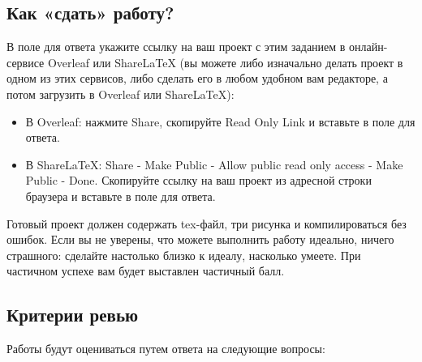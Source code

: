 \documentclass[a4paper,12pt]{article}
\begin{document}
\subsection*{Как «сдать» работу?}

В поле для ответа укажите ссылку на ваш проект с этим заданием в онлайн-сервисе Overleaf или ShareLaTeX (вы можете либо изначально делать проект в одном из этих сервисов, либо сделать его в любом удобном вам редакторе, а потом загрузить в Overleaf или ShareLaTeX):

\begin{itemize}
    \item В Overleaf: нажмите Share, скопируйте Read Only Link и вставьте в поле для ответа.
    \item В ShareLaTeX: Share - Make Public - Allow public read only access - Make Public - Done. Скопируйте ссылку на ваш проект из адресной строки браузера и вставьте в поле для ответа.
\end{itemize}

Готовый проект должен содержать tex-файл, три рисунка и компилироваться без ошибок. Если вы не уверены, что можете выполнить работу идеально, ничего страшного: сделайте настолько близко к идеалу, насколько умеете. При частичном успехе вам будет выставлен частичный балл.

\subsection*{Критерии ревью}

\noindent 
Работы будут оцениваться путем ответа на следующие вопросы:
\end{document}

